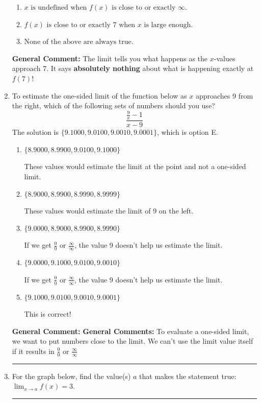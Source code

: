 \documentclass{extbook}[14pt]
\newcommand{\litem}[1]{\item #1

\rule{\textwidth}{0.4pt}}
\begin{document}
\begin{enumerate}
{\begin{enumerate}[label=\Alph*.]
\item \( x \text{ is undefined when } f(x) \text{ is close to or exactly } \infty. \)


\item \( f(x) \text{ is close to or exactly } 7 \text{ when } x \text{ is large enough}. \)


\item \( \text{None of the above are always true.} \)


\end{enumerate}

\textbf{General Comment:} The limit tells you what happens as the $x$-values approach $7$. It says \textbf{absolutely nothing} about what is happening exactly at $f(7)$!
}
\litem{
To estimate the one-sided limit of the function below as $x$ approaches 9 from the right, which of the following sets of numbers should you use?
\[ \frac{\frac{9}{x} - 1}{x - 9} \]The solution is \( \{ 9.1000, 9.0100, 9.0010, 9.0001 \} \), which is option E.\begin{enumerate}[label=\Alph*.]
\item \( \{ 8.9000, 8.9900, 9.0100, 9.1000 \} \)

These values would estimate the limit at the point and not a one-sided limit.
\item \( \{ 8.9000, 8.9900, 8.9990, 8.9999 \} \)

These values would estimate the limit of 9 on the left.
\item \( \{ 9.0000, 8.9000, 8.9900, 8.9990 \} \)

If we get $\frac{0}{0}$ or $\frac{\infty}{\infty}$, the value 9 doesn't help us estimate the limit.
\item \( \{ 9.0000, 9.1000, 9.0100, 9.0010 \} \)

If we get $\frac{0}{0}$ or $\frac{\infty}{\infty}$, the value 9 doesn't help us estimate the limit.
\item \( \{ 9.1000, 9.0100, 9.0010, 9.0001 \} \)

This is correct!
\end{enumerate}

\textbf{General Comment:} \textbf{General Comments:} To evaluate a one-sided limit, we want to put numbers close to the limit. We can't use the limit value itself if it results in $\frac{0}{0}$ or $\frac{\infty}{\infty}$
}
\litem{
For the graph below, find the value(s) $a$ that makes the statement true: $ \displaystyle \lim_{x \rightarrow a} f(x) = 3$.

}
\end{enumerate}
\end{document}
